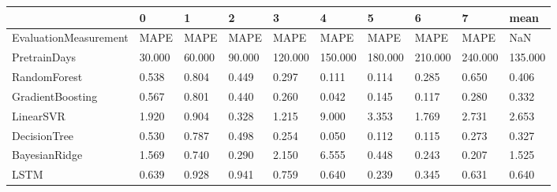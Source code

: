 \begin{tabular}{llllllllll}
\toprule
{} &      0 &      1 &      2 &       3 &       4 &       5 &       6 &       7 &    mean \\
\midrule
EvaluationMeasurement &   MAPE &   MAPE &   MAPE &    MAPE &    MAPE &    MAPE &    MAPE &    MAPE &     NaN \\
PretrainDays          & 30.000 & 60.000 & 90.000 & 120.000 & 150.000 & 180.000 & 210.000 & 240.000 & 135.000 \\
RandomForest          &  0.538 &  0.804 &  0.449 &   0.297 &   0.111 &   0.114 &   0.285 &   0.650 &   0.406 \\
GradientBoosting      &  0.567 &  0.801 &  0.440 &   0.260 &   0.042 &   0.145 &   0.117 &   0.280 &   0.332 \\
LinearSVR             &  1.920 &  0.904 &  0.328 &   1.215 &   9.000 &   3.353 &   1.769 &   2.731 &   2.653 \\
DecisionTree          &  0.530 &  0.787 &  0.498 &   0.254 &   0.050 &   0.112 &   0.115 &   0.273 &   0.327 \\
BayesianRidge         &  1.569 &  0.740 &  0.290 &   2.150 &   6.555 &   0.448 &   0.243 &   0.207 &   1.525 \\
LSTM                  &  0.639 &  0.928 &  0.941 &   0.759 &   0.640 &   0.239 &   0.345 &   0.631 &   0.640 \\
\bottomrule
\end{tabular}
